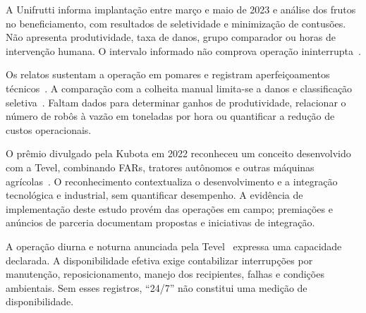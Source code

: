 A Unifrutti informa implantação entre março e maio de 2023 e análise dos frutos no beneficiamento, com resultados de seletividade e minimização de contusões. Não apresenta produtividade, taxa de danos, grupo comparador ou horas de intervenção humana. O intervalo informado não comprova operação ininterrupta~\cite{unifrutti2023tevel}.

Os relatos sustentam a operação em pomares e registram aperfeiçoamentos técnicos~\cite{tevel2021rivoira,ellis2022tevel,unifrutti2023tevel}. A comparação com a colheita manual limita-se a danos e classificação seletiva~\cite{ellis2022tevel}. Faltam dados para determinar ganhos de produtividade, relacionar o número de robôs à vazão em toneladas por hora ou quantificar a redução de custos operacionais.

O prêmio divulgado pela Kubota em 2022 reconheceu um conceito desenvolvido com a Tevel, combinando \acp{FAR}, tratores autônomos e outras máquinas agrícolas~\cite{kubota2022agrifuture}. O reconhecimento contextualiza o desenvolvimento e a integração tecnológica e industrial, sem quantificar desempenho. A evidência de implementação deste estudo provém das operações em campo; premiações e anúncios de parceria documentam propostas e iniciativas de integração.

A operação diurna e noturna anunciada pela Tevel~\cite{tevel2026} expressa uma capacidade declarada. A disponibilidade efetiva exige contabilizar interrupções por manutenção, reposicionamento, manejo dos recipientes, falhas e condições ambientais. Sem esses registros, ``24/7'' não constitui uma medição de disponibilidade.